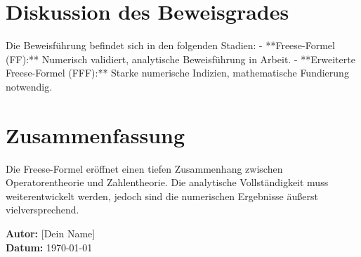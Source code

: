 \documentclass[a4paper,12pt]{article}
\begin{document}
\section{Diskussion des Beweisgrades}
Die Beweisführung befindet sich in den folgenden Stadien:
- **Freese-Formel (FF):** Numerisch validiert, analytische Beweisführung in Arbeit.
- **Erweiterte Freese-Formel (FFF):** Starke numerische Indizien, mathematische Fundierung notwendig.

\section{Zusammenfassung}
Die Freese-Formel eröffnet einen tiefen Zusammenhang zwischen Operatorentheorie und Zahlentheorie. Die analytische Vollständigkeit muss weiterentwickelt werden, jedoch sind die numerischen Ergebnisse äußerst vielversprechend.

\vfill
\textbf{Autor:} [Dein Name] \\
\textbf{Datum:} \today
\end{document}
